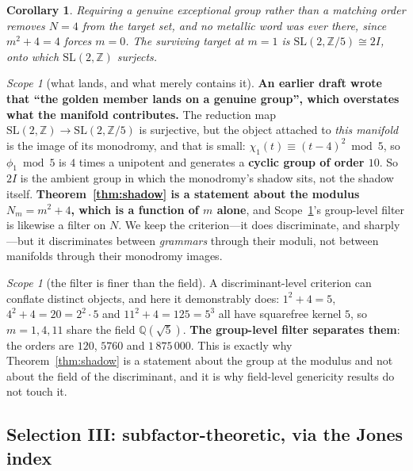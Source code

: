 \documentclass[11pt,reqno]{amsart}
\theoremstyle{plain}
\newtheorem{corollary}[theorem]{Corollary}
\theoremstyle{definition}
\theoremstyle{remark}
\newtheorem{scope}[theorem]{Scope}
\newcommand{\Q}{\mathbb{Q}}
\newcommand{\Z}{\mathbb{Z}}
\newcommand{\SL}{\mathrm{SL}}
\begin{document}
\begin{corollary}
Requiring a genuine exceptional \emph{group} rather than a matching order removes $N=4$
from the target set, and no metallic word was ever there, since $m^2+4=4$ forces $m=0$.
The surviving target at $m=1$ is $\SL(2,\Z/5)\cong2I$, onto which $\SL(2,\Z)$ surjects.
\end{corollary}

\begin{scope}[what lands, and what merely contains it]\label{sc:landing}
\textbf{An earlier draft wrote that ``the golden member lands on a genuine group'', which
overstates what the manifold contributes.} The reduction map
$\SL(2,\Z)\to\SL(2,\Z/5)$ is surjective, but the object attached to \emph{this manifold}
is the image of its monodromy, and that is small: $\chi_1(t)\equiv(t-4)^2 \bmod 5$, so
$\phi_1\bmod5$ is $4$ times a unipotent and generates a \textbf{cyclic group of order
$10$}. So $2I$ is the ambient group in which the monodromy's shadow sits, not the shadow
itself. \textbf{Theorem~\ref{thm:shadow} is a statement about the modulus $N_m=m^2+4$,
which is a function of $m$ alone}, and Scope~\ref{sc:finer}'s group-level filter is
likewise a filter on $N$. We keep the criterion---it does discriminate, and sharply---but
it discriminates between \emph{grammars} through their moduli, not between manifolds
through their monodromy images.
\end{scope}

\begin{scope}[the filter is finer than the field]\label{sc:finer}
A discriminant-level criterion can conflate distinct objects, and here it demonstrably
does: $1^2{+}4=5$, $4^2{+}4=20=2^2\cdot5$ and $11^2{+}4=125=5^3$ all have squarefree
kernel $5$, so $m=1,4,11$ share the field $\Q(\sqrt5)$. \textbf{The group-level filter
separates them}: the orders are $120$, $5760$ and $1\,875\,000$. This is exactly why
Theorem~\ref{thm:shadow} is a statement about the group at the modulus and not about the
field of the discriminant, and it is why field-level genericity results do not touch it.
\end{scope}

\subsection{Selection III: subfactor-theoretic, via the Jones index}\label{sec:jones}
\end{document}
